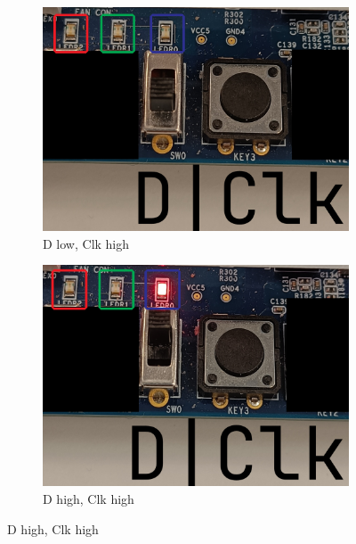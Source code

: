\documentclass{article}
\begin{document}
\clearpage
\begin{figure}[h]
    \centering
    \begin{subfigure}[t]{0.45\textwidth}
        \centering
        \includegraphics[width=1\textwidth]{Figures/Part4_1.jpg}
        \caption{D low, Clk high}
        \label{fig:p4_1}
    \end{subfigure}
    \hfill
    \begin{subfigure}[t]{0.45\textwidth}
        \centering
        \includegraphics[width=1\textwidth]{Figures/Part4_2.jpg}
        \caption{D high, Clk high}
        \label{fig:p4_2}
    \end{subfigure}
    

\end{figure}
\end{document}
